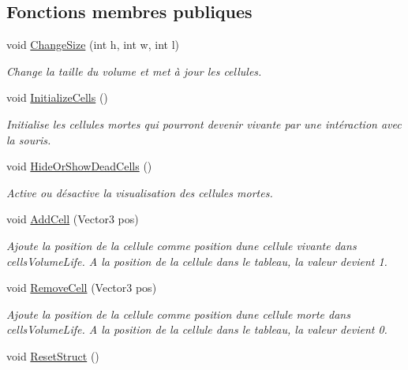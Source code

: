 \subsection*{Fonctions membres publiques}
\begin{DoxyCompactItemize}
\item 
void \mbox{\hyperlink{class_edit_mode_manager_acab9d2ee3853d18b73e82135d800c341}{Change\+Size}} (int h, int w, int l)
\begin{DoxyCompactList}\small\item\em Change la taille du volume et met à jour les cellules. \end{DoxyCompactList}\item 
void \mbox{\hyperlink{class_edit_mode_manager_a8a950f58c809a7161d85e5d9a73e4d15}{Initialize\+Cells}} ()
\begin{DoxyCompactList}\small\item\em Initialise les cellules mortes qui pourront devenir vivante par une intéraction avec la souris. \end{DoxyCompactList}\item 
void \mbox{\hyperlink{class_edit_mode_manager_ad64498838abd29826c929cad104924be}{Hide\+Or\+Show\+Dead\+Cells}} ()
\begin{DoxyCompactList}\small\item\em Active ou désactive la visualisation des cellules mortes. \end{DoxyCompactList}\item 
void \mbox{\hyperlink{class_edit_mode_manager_a9f9fbe57f5bbb6b90dc1dc321d411c54}{Add\+Cell}} (Vector3 pos)
\begin{DoxyCompactList}\small\item\em Ajoute la position de la cellule comme position d\textquotesingle{}une cellule vivante dans cells\+Volume\+Life. A la position de la cellule dans le tableau, la valeur devient 1. \end{DoxyCompactList}\item 
void \mbox{\hyperlink{class_edit_mode_manager_a8a8c1a3a9558fbbcfa7c15d8ce48a264}{Remove\+Cell}} (Vector3 pos)
\begin{DoxyCompactList}\small\item\em Ajoute la position de la cellule comme position d\textquotesingle{}une cellule morte dans cells\+Volume\+Life. A la position de la cellule dans le tableau, la valeur devient 0. \end{DoxyCompactList}\item 
void \mbox{\hyperlink{class_edit_mode_manager_afc8be75da1a5042fcf78b0e9bf1e2108}{Reset\+Struct}} ()

\end{DoxyCompactItemize}

